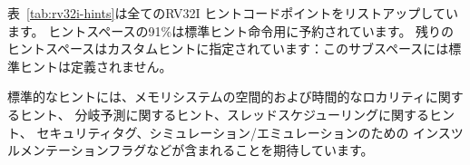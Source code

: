 表~\ref{tab:rv32i-hints}は全てのRV32I ヒントコードポイントをリストアップしています。
ヒントスペースの91\%は標準ヒント命令用に予約されています。
残りのヒントスペースはカスタムヒントに指定されています：このサブスペースには標準ヒントは定義されません。

\begin{commentary}
\begin{comment}
We anticipate
standard hints to eventually include memory-system spatial and
temporal locality hints, branch prediction hints, thread-scheduling
hints, security tags, and instrumentation flags for
simulation/emulation.
\end{comment}

標準的なヒントには、メモリシステムの空間的および時間的なロカリティに関するヒント、
分岐予測に関するヒント、スレッドスケジューリングに関するヒント、
セキュリティタグ、シミュレーション/エミュレーションのための
インスツルメンテーションフラグなどが含まれることを期待しています。

\end{commentary}

